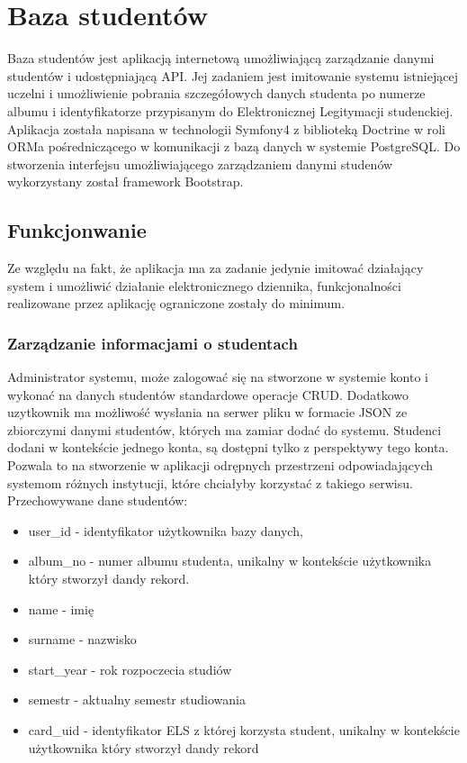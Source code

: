 \documentclass[declaration,shortabstract, mgr]{iithesis}
\begin{document}
\section{Baza studentów}
\indent Baza studentów jest aplikacją internetową umożliwiającą zarządzanie danymi studentów i udostępniającą API. Jej zadaniem jest imitowanie systemu istniejącej uczelni i umożliwienie pobrania szczegółowych danych studenta po numerze albumu i identyfikatorze przypisanym do Elektronicznej Legitymacji studenckiej.\\
\indent Aplikacja została napisana w technologii Symfony4\cite{symfony} z biblioteką Doctrine\cite{doctrine} w roli ORMa pośredniczącego w komunikacji z bazą danych w systemie PostgreSQL. Do stworzenia interfejsu umożliwiającego zarządzaniem danymi studenów wykorzystany został framework Bootstrap.\\
\subsection{Funkcjonwanie}
\indent Ze względu na fakt, że aplikacja ma za zadanie jedynie imitować działający system i umożliwić działanie elektronicznego dziennika, funkcjonalności realizowane przez aplikację ograniczone zostały do minimum. 
\subsubsection{Zarządzanie informacjami o studentach}
\indent Administrator systemu, może zalogować się na stworzone w systemie konto i wykonać na danych studentów  standardowe operacje CRUD. Dodatkowo uzytkownik ma możliwość wysłania na serwer pliku w formacie JSON ze zbiorczymi danymi studentów, których ma zamiar dodać do systemu. Studenci dodani w kontekście jednego konta, są dostępni tylko z perspektywy tego konta.
Pozwala to na stworzenie w aplikacji odrępnych przestrzeni odpowiadających systemom różnych instytucji, które chciałyby korzystać z takiego serwisu.\\
\indent Przechowywane dane studentów:
\begin{itemize}
\item user\_id - identyfikator użytkownika bazy danych,
\item album\_no - numer albumu studenta, unikalny w kontekście użytkownika który stworzył dandy rekord.
\item name - imię
\item surname - nazwisko
\item start\_year - rok rozpoczecia studiów
\item semestr - aktualny semestr studiowania
\item card\_uid - identyfikator ELS z której korzysta student, unikalny w kontekście użytkownika który stworzył dandy rekord
\end{itemize}
\end{document}
